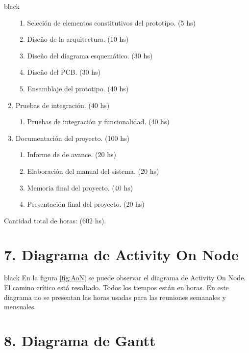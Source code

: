 \documentclass[11pt]{charter}
\begin{document}
\begin{consigna}{black}
\begin{enumerate}
    \begin{enumerate}
    	\item Seleción de elementos constitutivos del prototipo. \hfill(5 hs)
    	\item Diseño de la arquitectura. \hfill(10 hs)
    	\item Diseño del diagrama esquemático. \hfill(30 hs)
    	\item Diseño del PCB. \hfill(30 hs)
    	\item Ensamblaje del prototipo. \hfill(40 hs)
    \end{enumerate}
	\item Pruebas de integración. \hfill(40 hs)
	\begin{enumerate}
		\item Pruebas de integración y funcionalidad. \hfill(40 hs)
	\end{enumerate}
	\item Documentación del proyecto. \hfill(100 hs)
	\begin{enumerate}
		\item Informe de de avance. \hfill(20 hs)
		\item Elaboración del manual del sistema. \hfill(20 hs)
		\item Memoria final del proyecto. \hfill(40 hs)
		\item Presentación final del proyecto. \hfill(20 hs)
	\end{enumerate}
    	
\end{enumerate}

Cantidad total de horas: (602 hs).

\end{consigna}

\section{7. Diagrama de Activity On Node}
\label{sec:AoN}

\begin{consigna}{black}
En la figura \ref{fig:AoN} se puede observar el diagrama de Activity On Node. El camino crítico está resaltado. Todos los tiempos están en horas. En este diagrama no se presentan las horas usadas para las reuniones semanales y mensuales.
\end{consigna}

\section{8. Diagrama de Gantt}
\label{sec:gantt}
\end{document}
